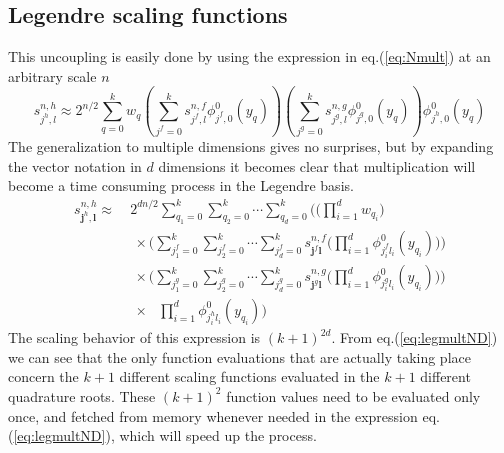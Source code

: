 \subsection*{Legendre scaling functions}
This uncoupling is easily done by using the expression in
eq.(\ref{eq:Nmult}) at an arbitrary scale $n$
\begin{equation}
	s^{n,h}_{j^h,l} \approx
	2^{n/2}\sum_{q=0}^k w_q 
	\left(\sum_{j^f=0}^ks^{n,f}_{j^f,l}\phi^0_{j^f,0}(y_q)\right)
	\left(\sum_{j^g=0}^ks^{n,g}_{j^g,l}\phi^0_{j^g,0}(y_q)\right)
	\phi^0_{j^h,0}(y_q)
	\label{eq:nmult}
\end{equation}
The generalization to multiple dimensions gives no surprises, but by expanding
the vector notation in $d$ dimensions it becomes clear that multiplication
will become a time consuming process in the Legendre basis.
\begin{align}
	\nonumber
	s^{n,h}_{\boldsymbol{j}^h,\boldsymbol{l}} 
	\approx&\ 2^{dn/2} 
	\sum_{q_1=0}^k\sum_{q_2=0}^k\cdots\sum_{q_d=0}^k\Bigg(
	\bigg(\prod_{i=1}^dw_{q_i}\bigg)\\
	\nonumber
	&\ \ \times\Bigg(\sum_{j^f_1=0}^k\sum_{j^f_2=0}^k\cdots\sum_{j^f_d=0}^k
	s^{n,f}_{\boldsymbol{j}^f\boldsymbol{l}} \bigg(
	\prod_{i=1}^d\phi^0_{j^f_il_i}(y_{q_i})\bigg)\Bigg)\\
	\nonumber
	&\ \ \times\Bigg(\sum_{j^g_1=0}^k\sum_{j^g_2=0}^k\cdots\sum_{j^g_d=0}^k
	s^{n,g}_{\boldsymbol{j}^g\boldsymbol{l}} \bigg(
	\prod_{i=1}^d\phi^0_{j^g_il_i}(y_{q_i})\bigg)\Bigg)\\
	&\ \ \times \ \ \ 
	\prod_{i=1}^d\phi^0_{j^h_il_i}(y_{q_i})\Bigg)
	\label{eq:legmultND}
\end{align}
The scaling behavior of this expression is $(k+1)^{2d}$. From
eq.(\ref{eq:legmultND}) we can see that the only function evaluations that are
actually taking place concern the $k+1$ different scaling functions evaluated 
in the $k+1$ different quadrature roots. These $(k+1)^2$ function
values need to be evaluated only once, and fetched from memory whenever
needed in the expression eq.(\ref{eq:legmultND}), which will speed up the
process.

